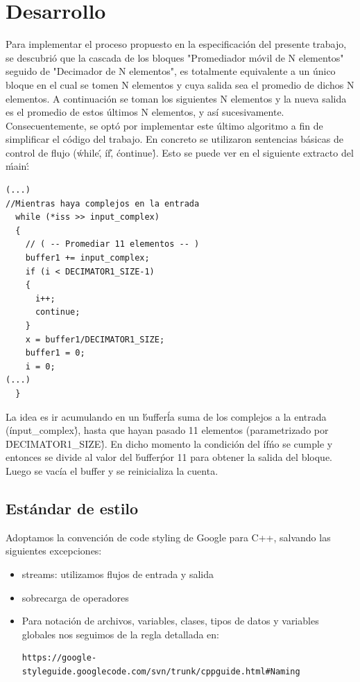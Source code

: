 \documentclass[10pt,a4paper]{article}
\begin{document}
\section{Desarrollo}
Para implementar el proceso propuesto en la especificación del presente trabajo, se descubrió que la cascada de los bloques "Promediador móvil de N elementos" seguido de "Decimador de N elementos", es totalmente equivalente a un único bloque en el cual se tomen N elementos y cuya salida sea el promedio de dichos N elementos. A continuación se toman los siguientes N elementos y la nueva salida es el promedio de estos últimos N elementos, y así sucesivamente.\\

 Consecuentemente, se optó por implementar este último algoritmo a fin de simplificar el código del trabajo. En concreto se utilizaron sentencias básicas de control de flujo (\'while\', \'if\', \'continue\'). Esto se puede ver en el siguiente extracto del \'main\':

\begin{verbatim}
(...)
//Mientras haya complejos en la entrada
  while (*iss >> input_complex)
  {
    // ( -- Promediar 11 elementos -- )
    buffer1 += input_complex;
    if (i < DECIMATOR1_SIZE-1)
    {
      i++;
      continue;
    }
    x = buffer1/DECIMATOR1_SIZE;
    buffer1 = 0;
    i = 0;
(...)
  }
\end{verbatim}
La idea es ir acumulando en un \'buffer\' la suma de los complejos a la entrada (\'input\_complex\'), hasta que hayan pasado 11 elementos (parametrizado por \'DECIMATOR1\_SIZE\'). En dicho momento la condición del \'if\' no se cumple y entonces se divide al valor del \'buffer\' por 11 para obtener la salida del bloque. Luego se vacía el buffer y se reinicializa la cuenta.\\



\subsection{Estándar de estilo}
Adoptamos la convención de code styling de Google para C++, salvando las siguientes excepciones:\\
\begin{itemize}
\item streams: utilizamos flujos de entrada y salida
\item sobrecarga de operadores
\item 

Para notación de archivos, variables, clases, tipos de datos y variables globales nos seguimos de la regla detallada en:
\begin{verbatim}
https://google-styleguide.googlecode.com/svn/trunk/cppguide.html#Naming
\end{verbatim}
\end{itemize}
\end{document}
